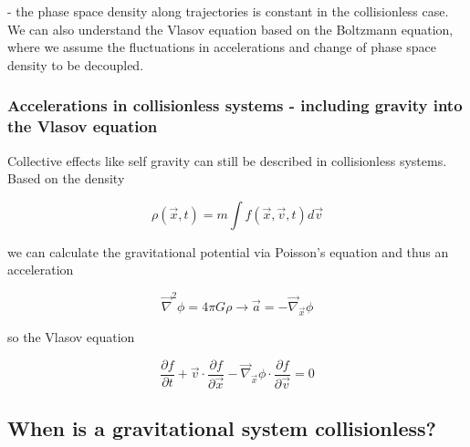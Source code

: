 - the phase space density along trajectories is constant in the collisionless case. We can also understand
the Vlasov equation based on the Boltzmann equation, where we assume the fluctuations
in accelerations and change of phase space density to be decoupled.

\subsubsection{Accelerations in collisionless systems - including gravity into the Vlasov equation}
Collective effects like self gravity can still be described in collisionless systems. Based on the density

\begin{equation}
    \rho(\vec{x},t) = m \int f(\vec{x},\vec{v},t) d\vec{v}
\end{equation}

we can calculate the gravitational potential via Poisson's equation and thus an acceleration

\begin{equation}
    \vec{\nabla}^2 \phi = 4\pi G \rho \rightarrow \vec{a} = -\vec{\nabla}_\vec{x} \phi
\end{equation}

so the Vlasov equation

\begin{equation}
    \frac{\partial f}{\partial t}+\vec{v} \cdot \frac{\partial f}{\partial \vec{x}} - \vec{\nabla}_\vec{x} \phi \cdot \frac{\partial f}{\partial \vec{v}}=0
\end{equation}


\subsection{When is a gravitational system collisionless?}

